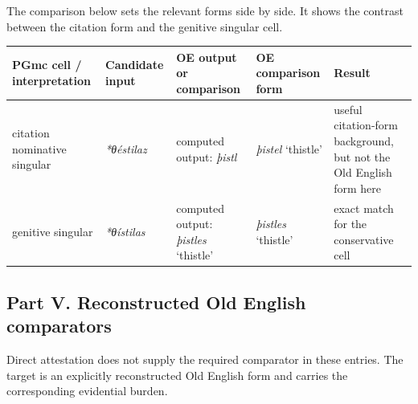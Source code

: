 \documentclass[
  british,
  a4paper,
]{article}
\newcounter{none} %
\begin{document}
The comparison below sets the relevant forms side by side. It shows the
contrast between the citation form and the genitive singular cell.

{\def\LTcaptype{none} %
\begin{longtable}[]{@{}
  >{\raggedright\arraybackslash}p{}
  >{\raggedright\arraybackslash}p{}
  >{\raggedright\arraybackslash}p{}
  >{\raggedright\arraybackslash}p{}
  >{\raggedright\arraybackslash}p{}@{}}
\toprule\noalign{}
\begin{minipage}[b]{\linewidth}\raggedright
PGmc cell / interpretation
\end{minipage} & \begin{minipage}[b]{\linewidth}\raggedright
Candidate input
\end{minipage} & \begin{minipage}[b]{\linewidth}\raggedright
OE output or comparison
\end{minipage} & \begin{minipage}[b]{\linewidth}\raggedright
OE comparison form
\end{minipage} & \begin{minipage}[b]{\linewidth}\raggedright
Result
\end{minipage} \\
\midrule\noalign{}
\endhead
\bottomrule\noalign{}
\endlastfoot
citation nominative singular & {\emph{*θéstilaz}} & computed output:
{\emph{þistl}} & {\emph{þistel}} `thistle' & useful citation-form
background, but not the Old English form here \\
genitive singular & {\emph{*θístilas}} & computed output:
{\emph{þistles}} `thistle' & {\emph{þistles}} `thistle' & exact match
for the conservative cell \\
\end{longtable}
}

\clearpage

\subsection{Part V. Reconstructed Old English
comparators}\label{part-v.-reconstructed-old-english-comparators}

Direct attestation does not supply the required comparator in these
entries. The target is an explicitly reconstructed Old English form and
carries the corresponding evidential burden.
\end{document}
